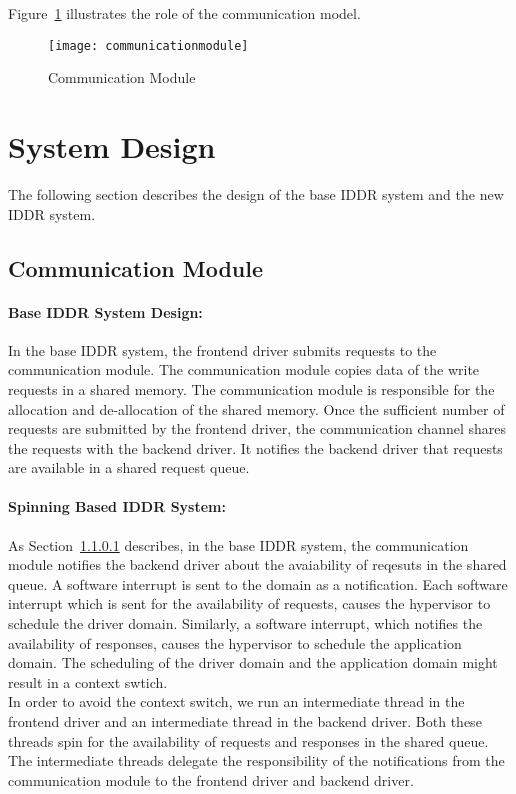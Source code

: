 Figure~\ref{fig:communication} illustrates the role of the communication model. 
\begin{figure}[!ht]
\centering
\texttt{[image: communicationmodule]}
\caption{Communication Module}
\label{fig:communication}
\end{figure}

\section{System Design}\label{design}

The following section describes the design of the base IDDR system and the new IDDR system. 

\subsection{Communication Module}

\paragraph{Base IDDR System Design:}
\label{par:base IDDR communication}
In the base IDDR system, the frontend driver submits requests to the communication module. The communication module copies data of the write requests in a shared memory. The communication module is responsible for the allocation and de-allocation of the shared memory. Once the sufficient number of requests are submitted by the frontend driver, the communication channel shares the requests with the backend driver. It notifies the backend driver that requests are available in a shared request queue.

\paragraph{Spinning Based IDDR System:}
\label{par:spin IDDR communication}
As Section~\ref{par:base IDDR communication} describes, in the base IDDR system, the communication module notifies the backend driver about the avaiability of reqesuts in the shared queue. A software interrupt is sent to the domain as a notification. Each software interrupt which is sent for the availability of requests, causes the hypervisor to schedule the driver domain. Similarly, a software interrupt, which notifies the availability of responses, causes the hypervisor to schedule the application domain. The scheduling of the driver domain and the application domain might result in a context swtich. 
\\[3mm]
In order to avoid the context switch, we run an intermediate thread in the frontend driver and an intermediate thread in the backend driver. Both these threads spin for the availability of requests and responses in the shared queue. The intermediate threads delegate the responsibility of the notifications from the communication module to the frontend driver and backend driver. 

